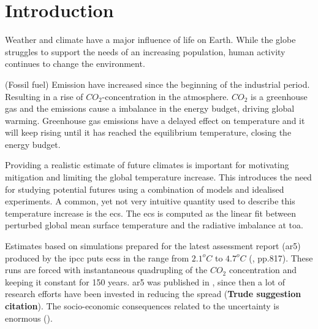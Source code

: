 \chapter{Introduction} \label{ch:introduction}
Weather and climate have a major influence of life on Earth. While the globe struggles to support the needs of an increasing population, human activity continues to change the environment. %

(Fossil fuel) Emission have increased since the beginning of the industrial period. Resulting in a rise of $CO_2$-concentration in the atmosphere. $CO_2$ is a greenhouse gas and the emissions cause a imbalance in the energy budget, driving global warming.
Greenhouse gas emissions have a delayed effect on temperature and it will keep rising until it has reached the equilibrium temperature, closing the energy budget. 

Providing a realistic estimate of future climates is important for motivating mitigation and limiting the global temperature increase. 
This introduces the need for studying potential futures using a combination of models and idealised experiments. A common, yet not very intuitive quantity used to describe this temperature increase is the \acrfull{ecs}. The \acrshort{ecs} is computed as the linear fit between perturbed global mean surface temperature and the radiative imbalance at \acrfull{toa}.

Estimates based on %
simulations prepared for the latest assessment report (\acrshort{ar5}) produced by the \acrfull{ipcc} puts \acrshort{ecs}s in the range from $2.1^oC$ to $4.7^oC$ (\cite{IPCC_CH9_climate_models}, pp.817). These runs are forced with instantaneous quadrupling of the $CO_2$ concentration %
and keeping it constant for 150 years.  
\acrshort{ar5} was published in \citeyear{IPCC_entire_book}, since then a lot of research efforts have been invested in reducing the spread (\textbf{Trude suggestion citation}).
The socio-economic consequences related to the uncertainty is enormous (\cite{bony2015}). 

